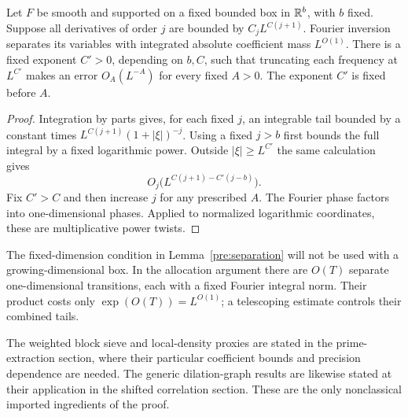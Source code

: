 \begin{lemma}\label{pre:separation}
Let $F$ be smooth and supported on a fixed bounded box in
$\mathbb{R}^b$, with $b$ fixed. Suppose all derivatives of order $j$ are
bounded by $C_jL^{C(j+1)}$. Fourier inversion separates its variables
with integrated absolute coefficient mass $L^{O(1)}$. There is a
fixed exponent $C'>0$, depending on $b,C$, such that truncating each
frequency at $L^{C'}$ makes an error $O_A(L^{-A})$ for every fixed
$A>0$. The exponent $C'$ is fixed before $A$.
\end{lemma}

\begin{proof}
Integration by parts gives, for each fixed $j$, an integrable tail
bounded by a constant times
$L^{C(j+1)}(1+|\xi|)^{-j}$. Using a fixed $j>b$ first bounds the
full integral by a fixed logarithmic power. Outside
$|\xi|\ge L^{C'}$ the same calculation gives
\[
 O_j\bigl(L^{C(j+1)-C'(j-b)}\bigr).
\]
Fix $C'>C$ and then increase $j$ for any prescribed $A$.
The Fourier phase factors into one-dimensional phases. Applied to
normalized logarithmic coordinates, these are multiplicative
power twists.
\end{proof}

The fixed-dimension condition in Lemma~\ref{pre:separation} will not
be used with a growing-dimensional box. In the allocation argument
there are $O(T)$ separate one-dimensional transitions, each with a
fixed Fourier integral norm. Their product costs only
$\exp(O(T))=L^{O(1)}$; a telescoping estimate controls their combined
tails.

The weighted block sieve and local-density proxies are stated in the
prime-extraction section, where their particular coefficient bounds
and precision dependence are needed. The generic dilation-graph
results are likewise stated at their application in the shifted
correlation section. These are the only nonclassical imported
ingredients of the proof.
